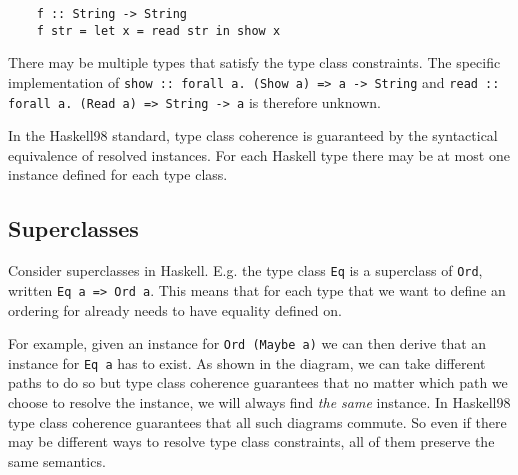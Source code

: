 \begin{verbatim}
    f :: String -> String
    f str = let x = read str in show x
\end{verbatim}

There may be multiple types that satisfy the type class constraints.
The specific implementation of \texttt{show :: forall a. (Show a) => a -> String} and \texttt{read :: forall a. (Read a) => String -> a} is therefore unknown.

In the Haskell98 standard, type class coherence is guaranteed by the syntactical equivalence of resolved instances.
For each Haskell type there may be at most one instance defined for each type class.


\subsection{Superclasses}

Consider superclasses in Haskell.
E.g. the type class \texttt{Eq} is a superclass of \texttt{Ord}, written \texttt{Eq a => Ord a}.
This means that for each type that we want to define an ordering for already needs to have equality defined on.

For example, given an instance for \texttt{Ord (Maybe a)} we can then derive that an instance for \texttt{Eq a} has to exist.
As shown in the diagram, we can take different paths to do so but type class coherence guarantees that no matter which path we choose to resolve the instance, we will always find \emph{the same} instance.
In Haskell98 type class coherence guarantees that all such diagrams commute.
So even if there may be different ways to resolve type class constraints, all of them preserve the same semantics.


